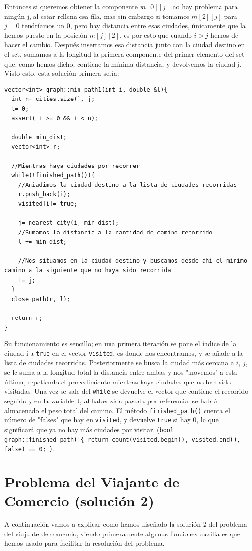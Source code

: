 \documentclass[11pt]{article}
\begin{document}
Entonces si queremos obtener la componente $m[0][j]$ no hay problema para ningún j, al estar rellena esa fila, mas sin embargo si tomamos $m[2][j]$ para $j= 0$ tendríamos un 0, pero hay distancia entre esas ciudades, únicamente que la hemos puesto en la posición $m[j][2]$, es por esto que cuando $i>j$ hemos de hacer el cambio. Después insertamos esa distancia junto con la ciudad destino en el set, sumamos a la longitud la primera componente del primer elemento del set que, como hemos dicho, contiene la mínima distancia, y devolvemos la ciudad j. Visto esto, esta solución primera sería:

\begin{lstlisting}
vector<int> graph::min_path1(int i, double &l){
  int n= cities.size(), j;
  l= 0;
  assert( i >= 0 && i < n);

  double min_dist;
  vector<int> r;

  //Mientras haya ciudades por recorrer
  while(!finished_path()){
    //Aniadimos la ciudad destino a la lista de ciudades recorridas
    r.push_back(i);
    visited[i]= true;

    j= nearest_city(i, min_dist);
    //Sumamos la distancia a la cantidad de camino recorrido
    l += min_dist;

    //Nos situamos en la ciudad destino y buscamos desde ahi el minimo camino a la siguiente que no haya sido recorrida
    i= j;
  }
  close_path(r, l);

  return r;
}
\end{lstlisting} 
Su funcionamiento es sencillo; en una primera iteración se pone el índice de la ciudad i a \verb|true| en el vector \verb|visited|, es donde nos encontramos, y se añade a la lista de ciudades recorridas. Posteriormente se busca la ciudad más cercana a $i$, $j$, se le suma a la longitud total la distancia entre ambas y nos "movemos" a esta última, repetiendo el procedimiento mientras haya ciudades que no han sido visitadas. Una vez se sale del \verb|while| se devuelve el vector que contiene el recorrido seguido y en la variable \verb|l|, al haber sido pasada por referencia, se habrá almacenado el peso total del camino. El método \verb|finished_path()| cuenta el número de "falses" que hay en \verb|visited|, y devuelve \verb|true| si hay 0, lo que significará que ya no hay más ciudades por visitar. (\verb|bool graph::finished_path(){ return count(visited.begin(), visited.end(), false) == 0; }|.

\section{Problema del Viajante de Comercio (solución 2)}
A continuación vamos a explicar como hemos diseñado la solución 2 del problema del viajante de comercio, viendo primeramente algunas funciones auxiliares que hemos usado para facilitar la resolución del problema.
\end{document}
